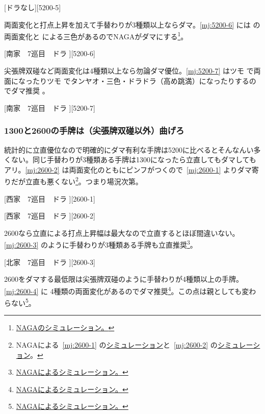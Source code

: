 \documentclass[../nankiru_main.tex]{subfiles}
\begin{document}
[ドラなし][5200-5]

両面変化と打点上昇を加えて手替わりが3種類以上ならダマ。\ref{mj:5200-6} には  の両面変化と  による三色があるのでNAGAがダマにする\footnote{\href{https://naga.dmv.nico/htmls/5f722b66e454e8ca530c15f05573ba08a6589ae633008265c74ac71b05559d11v2_2.html?tw=1}{NAGAのシミュレーション。}}。

[南家　7巡目　ドラ ][5200-6]

尖張牌双碰など両面変化は4種類以上なら勿論ダマ優位。\ref{mj:5200-7} はツモ  で両面になったりツモ  でタンヤオ・三色・ドラドラ（高め跳満）になったりするのでダマ推奨 \citep[][pp.~159--160]{ooi-gundou}。

[南家　7巡目　ドラ ][5200-7]


\subsubsection*{1300と2600の手牌は（尖張牌双碰以外）曲げろ}

統計的に立直優位なので明確的にダマ有利な手牌は5200に比べるとそんなんい多くない。同じ手替わりが3種類ある手牌は1300になったら立直してもダマしてもアリ。\ref{mj:2600-2} は両面変化のともにピンフがつくので~\ref{mj:2600-1} よりダマ寄りだが立直も悪くない\footnote{NAGAによる~\ref{mj:2600-1} の\href{https://naga.dmv.nico/htmls/5f722b66e454e8ca530c15f05573ba08a6589ae633008265c74ac71b05559d11v2_2.html?tw=2}{シミュレーション}と~\ref{mj:2600-2} の\href{https://naga.dmv.nico/htmls/a76d22f74a343f2c3cfa9f6192a7622c8c864b37ba8d1268cead9a4719c5d60cv2_2.html?tw=2}{シミュレーション}。}。つまり場況次第。

[西家　7巡目　ドラ ][2600-1]

[西家　7巡目　ドラ ][2600-2]

2600なら立直による打点上昇幅は最大なので立直するとほぼ間違いない。\ref{mj:2600-3} のように手替わりが3種類ある手牌も立直推奨\footnote{\href{https://naga.dmv.nico/htmls/5f722b66e454e8ca530c15f05573ba08a6589ae633008265c74ac71b05559d11v2_2.html?tw=3}{NAGAによるシミュレーション。}}。

[北家　7巡目　ドラ ][2600-3]

2600をダマする最低限は尖張牌双碰のように手替わりが4種類以上の手牌。\ref{mj:2600-4} に  4種類の両面変化があるのでダマ推奨\footnote{\href{https://naga.dmv.nico/htmls/a76d22f74a343f2c3cfa9f6192a7622c8c864b37ba8d1268cead9a4719c5d60cv2_2.html?tw=3}{NAGAによるシミュレーション。}}。この点は親としても変わらない\footnote{\href{https://naga.dmv.nico/htmls/311f251cbea342c02468c73edb45c300af705c7a6d395176b6855ba1278e0651v2_2.html?tw=4}{NAGAによるシミュレーション。}}。
\end{document}
